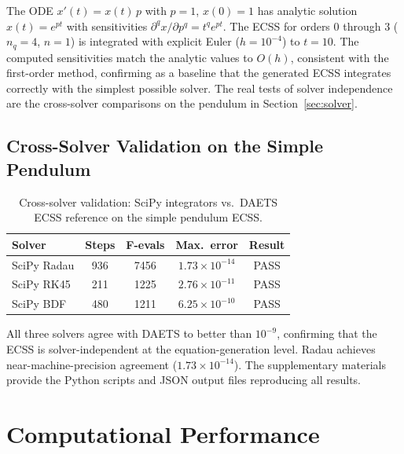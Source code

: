 \documentclass[12pt,a4paper]{article}
\theoremstyle{definition}
\theoremstyle{plain}
\theoremstyle{remark}
\begin{document}
The ODE $x'(t) = x(t)\,p$ with $p=1$, $x(0)=1$ has analytic solution $x(t) = e^{pt}$ with sensitivities $\partial^q x/\partial p^q = t^q e^{pt}$. The ECSS for orders $0$ through $3$ ($n_q=4$, $n=1$) is integrated with explicit Euler ($h=10^{-4}$) to $t=10$. The computed sensitivities match the analytic values to $O(h)$, consistent with the first-order method, confirming as a baseline that the generated ECSS integrates correctly with the simplest possible solver. The real tests of solver independence are the cross-solver comparisons on the pendulum in Section~\ref{sec:solver}.

\subsection{Cross-Solver Validation on the Simple Pendulum}

\begin{table}[htbp]
  \centering
  \caption{Cross-solver validation: SciPy integrators vs.\ DAETS ECSS reference on the simple pendulum ECSS.}
  \label{tab:cross_solver}
  \begin{tabular}{lcccc}
    \toprule
    Solver & Steps & F-evals & Max.\ error & Result \\
    \midrule
    SciPy Radau & 936 & 7456 & $1.73\times10^{-14}$ & PASS \\
    SciPy RK45  & 211 & 1225 & $2.76\times10^{-11}$ & PASS \\
    SciPy BDF   & 480 & 1211 & $6.25\times10^{-10}$ & PASS \\
    \bottomrule
  \end{tabular}
\end{table}

All three solvers agree with DAETS to better than $10^{-9}$, confirming that the ECSS is solver-independent at the equation-generation level. Radau achieves near-machine-precision agreement ($1.73\times10^{-14}$). The supplementary materials~\cite{cao2026supplement} provide the Python scripts and JSON output files reproducing all results.

\section{Computational Performance}
\label{sec:performance}
\end{document}
